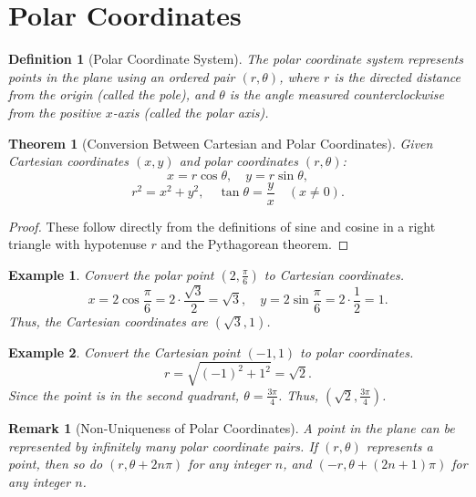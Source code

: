 \documentclass[11pt,a4paper]{article}
\newtheorem{example}{Example}
\newtheorem{theorem}{Theorem}
\newtheorem{definition}{Definition}
\newtheorem{remark}{Remark}
\begin{document}
\section{Polar Coordinates}
\begin{definition}[Polar Coordinate System]
The \textit{polar coordinate system} represents points in the plane using an ordered pair $(r, \theta)$, where $r$ is the directed distance from the origin (called the \textit{pole}), and $\theta$ is the angle measured counterclockwise from the positive $x$-axis (called the \textit{polar axis}).
\end{definition}
\begin{theorem}[Conversion Between Cartesian and Polar Coordinates]
Given Cartesian coordinates $(x, y)$ and polar coordinates $(r, \theta)$:
\[
x = r \cos \theta, \quad y = r \sin \theta,
\]
\[
r^2 = x^2 + y^2, \quad \tan \theta = \frac{y}{x} \quad (x \neq 0).
\]
\end{theorem}
\begin{proof}
These follow directly from the definitions of sine and cosine in a right triangle with hypotenuse $r$ and the Pythagorean theorem.
\end{proof}
\begin{center}
\end{center}
\begin{example}
Convert the polar point $\left( 2, \frac{\pi}{6} \right)$ to Cartesian coordinates.
\[
x = 2 \cos \frac{\pi}{6} = 2 \cdot \frac{\sqrt{3}}{2} = \sqrt{3}, \quad y = 2 \sin \frac{\pi}{6} = 2 \cdot \frac{1}{2} = 1.
\]
Thus, the Cartesian coordinates are $(\sqrt{3}, 1)$.
\end{example}
\begin{example}
Convert the Cartesian point $(-1, 1)$ to polar coordinates.
\[
r = \sqrt{(-1)^2 + 1^2} = \sqrt{2}.
\]
Since the point is in the second quadrant, $\theta = \frac{3\pi}{4}$. Thus, $(\sqrt{2}, \frac{3\pi}{4})$.
\end{example}
\begin{remark}[Non-Uniqueness of Polar Coordinates]
A point in the plane can be represented by infinitely many polar coordinate pairs. If $(r, \theta)$ represents a point, then so do $(r, \theta + 2n\pi)$ for any integer $n$, and $(-r, \theta + (2n+1)\pi)$ for any integer $n$.
\end{remark}
\end{document}

